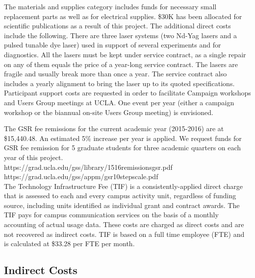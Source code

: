 \documentclass[11pt]{article}
\begin{document}
The materials and supplies category includes funds for necessary small
replacement parts as well as for electrical supplies. \$30K has been
allocated for scientific publications as a result of this project. The
additional direct costs include the following.  There are three laser
systems (two Nd-Yag lasers and a pulsed tunable dye laser) used in
support of several experiments and for diagnostics. All the lasers
must be kept under service contract, as a single repair on any of them
equals the price of a year-long service contract. The lasers are
fragile and usually break more than once a year. The service contract
also includes a yearly alignment to bring the laser up to its quoted
specifications.  Participant support costs are requested in order to
facilitate Campaign workshops and Users Group meetings at UCLA.  One
event per year (either a campaign workshop or the biannual on-site
Users Group meeting) is envisioned.


The GSR fee remissions for the current academic year (2015-2016) are
at \$15,440.48. An estimated 5\% increase per year is applied. We
request funds for GSR fee remission for 5 graduate students for three
academic quarters on each year of this project. \\[0.1truein]
{\ttfamily https://grad.ucla.edu/gss/library/1516remissionsgsr.pdf} \\
{\ttfamily https://grad.ucla.edu/gss/appm/gsr10stepscale.pdf} \\

The Technology Infrastructure Fee (TIF) is a consistently-applied direct charge that
is assessed to each and every campus activity unit, regardless of
funding source, including units identified as individual grant and
contract awards.  The TIF pays for campus communication services on
the basis of a monthly accounting of actual usage data.  These costs
are charged as direct costs and are not recovered as indirect costs.
TIF is based on a full time employee (FTE) and is calculated at \$33.28
per FTE per month.  

\subsection*{Indirect Costs}
\end{document}
